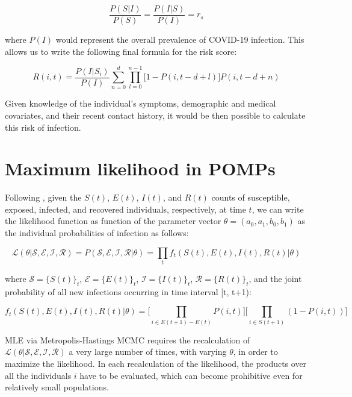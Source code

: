 \documentclass{article}
\newcommand{\Lik}{\mathcal{L}}
\newcommand{\Sus}{\mathcal{S}}
\newcommand{\Exp}{\mathcal{E}}
\newcommand{\Inf}{\mathcal{I}}
\newcommand{\Rec}{\mathcal{R}}
\begin{document}
\begin{equation}
\frac{P(S|I)}{P(S)}=\frac{P(I|S)}{P(I)}=r_s
\end{equation}

where $P(I)$ would represent the overall prevalence of COVID-19 infection. This allows us to write the following final formula for the risk score:

\begin{equation}
R(i, t)=\frac{P(I|S_i)}{P(I)}\sum\limits_{n=0}^{d}\prod\limits_{l=0}^{n-1}\big[1-P(i, t-d+l)\big]P(i, t-d+n)
\label{eq:14}
\end{equation}

Given knowledge of the individual's symptoms, demographic and medical covariates, and their recent contact history, it would be then possible to calculate this risk of infection.

\section{Maximum likelihood in POMPs}

Following \cite{Deardon2010}, given the $S(t)$, $E(t)$, $I(t)$, and $R(t)$ counts of susceptible, exposed, infected, and recovered individuals, respectively, at time $t$, we can write the likelihood function as function of the parameter vector $\theta=(a_0, a_1, b_0, b_1)$ as the individual probabilities of infection as follows:

\begin{equation}
\Lik(\theta|\Sus, \Exp, \Inf, \Rec)=P(\Sus, \Exp, \Inf, \Rec|\theta)=\prod\limits_{t}f_{t}(S(t), E(t), I(t), R(t)|\theta)
\end{equation}

where $\Sus=\{S(t)\}_t$, $\Exp=\{E(t)\}_t$, $\Inf=\{I(t)\}_t$, $\Rec=\{R(t)\}_t$, and the joint probability of all new infections occurring in time interval [t, t+1):

\begin{equation}
f_{t}(S(t), E(t), I(t), R(t)|\theta)=\Big[ \prod\limits_{i \in E(t+1)-E(t)} P(i, t) \Big] \Big[ \prod\limits_{i \in S(t+1)} (1-P(i, t)) \Big]
\end{equation}

MLE via Metropolis-Hastings MCMC requires the recalculation of $\Lik(\theta|\Sus, \Exp, \Inf, \Rec)$ a very large number of times, with varying $\theta$, in order to maximize the likelihood. In each recalculation of the likelihood, the products over all the individuals $i$ have to be evaluated, which can become prohibitive even for relatively small populations. 
\end{document}
